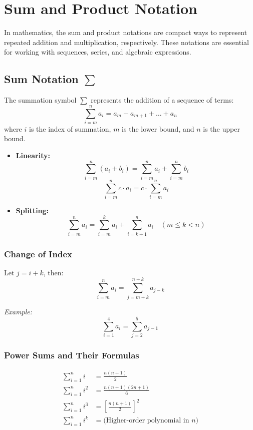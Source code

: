 \section{Sum and Product Notation}

In mathematics, the sum and product notations are compact ways to represent repeated addition and multiplication, respectively. These notations are essential for working with sequences, series, and algebraic expressions.

\subsection{Sum Notation \texorpdfstring{\(\sum\)}{∑}}

The summation symbol \(\sum\) represents the addition of a sequence of terms:
\[
\sum_{i = m}^{n} a_i = a_m + a_{m+1} + \dots + a_n
\]
where \(i\) is the index of summation, \(m\) is the lower bound, and \(n\) is the upper bound.

\begin{itemize}[label=\(-\)]
    \item \textbf{Linearity:}
    \[
    \sum_{i = m}^{n} (a_i + b_i) = \sum_{i = m}^{n} a_i + \sum_{i = m}^{n} b_i
    \]
    \[
    \sum_{i = m}^{n} c \cdot a_i = c \cdot \sum_{i = m}^{n} a_i
    \]
    \item \textbf{Splitting:}
    \[
    \sum_{i = m}^{n} a_i = \sum_{i = m}^{k} a_i + \sum_{i = k+1}^{n} a_i \quad (m \le k < n)
    \]
\end{itemize}

\subsubsection{Change of Index}

Let \(j = i + k\), then:
\[
\sum_{i = m}^{n} a_i = \sum_{j = m + k}^{n + k} a_{j - k}
\]

\textit{Example:}
\[
\sum_{i = 1}^{4} a_i = \sum_{j = 2}^{5} a_{j - 1}
\]

\subsubsection{Power Sums and Their Formulas}

\begin{align*}
\sum_{i = 1}^{n} i &= \frac{n(n+1)}{2} \\
\sum_{i = 1}^{n} i^2 &= \frac{n(n+1)(2n+1)}{6} \\
\sum_{i = 1}^{n} i^3 &= \left[\frac{n(n+1)}{2}\right]^2 \\
\sum_{i = 1}^{n} i^k &= \text{(Higher-order polynomial in \(n\))}
\end{align*}

